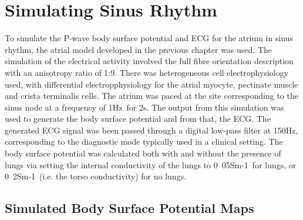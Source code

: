 \section{Simulating Sinus Rhythm}

To simulate the P-wave body surface potential and ECG for the atrium in sinus
rhythm, the atrial model developed in the previous chapter was used.
The simulation of the electrical activity involved the full fibre orientation
description with an anisotropy ratio of 1:9.
There was heterogeneous cell electrophysiology used, with differential
electropphysiology for the atrial myocyte, pectinate muscle and crista
terminalis cells.
The atrium was paced at the site corresponding to the sinus node at a frequency
of \unit{1}{Hz}\ for \unit{2}{s}.
The output from this simulation was used to generate the body surface potential
and from that, the ECG.
The generated ECG signal was been passed through a digital low-pass filter at
\unit{150}{Hz}, corresponding to the diagnostic mode typically used in a
clinical setting.
The body surface potential was calculated both with and without the presence of
lungs via setting the internal conductivity of the lungs to
\unit{0.05}{Sm-1}\ for lungs, or \unit{0.2}{Sm-1}\ (i.e. the torso
conductivity) for no lungs.

\subsection{Simulated Body Surface Potential Maps}

